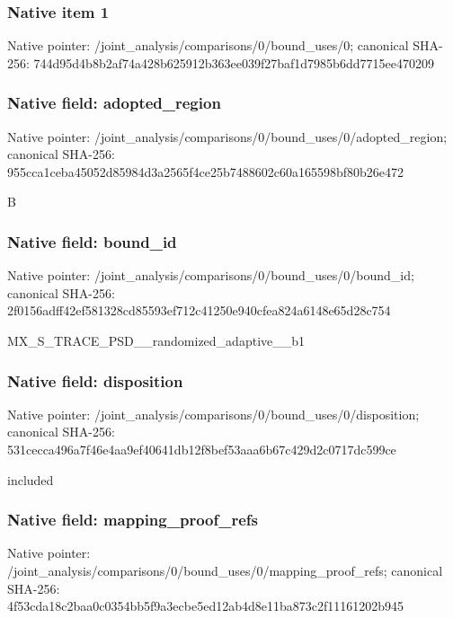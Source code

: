 \documentclass[10pt,a4paper]{article}
\begin{document}
\subsubsection{Native item 1}
Native pointer: /joint\_\allowbreak{}analysis/comparisons/0/bound\_\allowbreak{}uses/0; canonical SHA-256: 744d95d4b8b2af74a428b625912b363ee039f27baf1d7985b6dd7715ee470209

\subsubsection{Native field: adopted\_\allowbreak{}region}
Native pointer: /joint\_\allowbreak{}analysis/comparisons/0/bound\_\allowbreak{}uses/0/adopted\_\allowbreak{}region; canonical SHA-256: 955cca1ceba45052d85984d3a2565f4ce25b7488602c60a165598bf80b26e472

\begingroup\raggedright\sloppy B\par\endgroup

\subsubsection{Native field: bound\_\allowbreak{}id}
Native pointer: /joint\_\allowbreak{}analysis/comparisons/0/bound\_\allowbreak{}uses/0/bound\_\allowbreak{}id; canonical SHA-256: 2f0156adff42ef581328cd85593ef712c41250e940cfea824a6148e65d28c754

\begingroup\raggedright\sloppy MX\_\allowbreak{}S\_\allowbreak{}TRACE\_\allowbreak{}PSD\_\allowbreak{}\_\allowbreak{}randomized\_\allowbreak{}adaptive\_\allowbreak{}\_\allowbreak{}b1\par\endgroup

\subsubsection{Native field: disposition}
Native pointer: /joint\_\allowbreak{}analysis/comparisons/0/bound\_\allowbreak{}uses/0/disposition; canonical SHA-256: 531cecca496a7f46e4aa9ef40641db12f8bef53aaa6b67c429d2c0717dc599ce

\begingroup\raggedright\sloppy included\par\endgroup

\subsubsection{Native field: mapping\_\allowbreak{}proof\_\allowbreak{}refs}
Native pointer: /joint\_\allowbreak{}analysis/comparisons/0/bound\_\allowbreak{}uses/0/mapping\_\allowbreak{}proof\_\allowbreak{}refs; canonical SHA-256: 4f53cda18c2baa0c0354bb5f9a3ecbe5ed12ab4d8e11ba873c2f11161202b945
\end{document}
